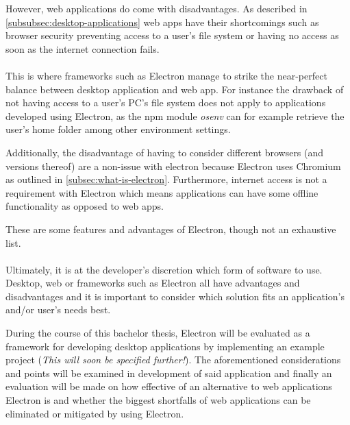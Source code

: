 
However, web applications do come with disadvantages. 
As described in \ref{subsubsec:desktop-applications} web apps have their shortcomings such as 
browser security preventing access to a user's file system or having no access as soon as the internet connection
fails.\paragraph{}
This is where frameworks such as Electron manage to strike the near-perfect balance between desktop application and web app.
For instance the drawback of not having access to a user's PC's file system does not apply to applications 
developed using Electron, as the npm module \emph{osenv} can for example retrieve the user's home folder among 
other environment settings. \parencite{osenv}\par
Additionally, the disadvantage of having to consider different browsers (and versions thereof) are a non-issue
with electron because Electron uses Chromium as outlined in \ref{subsec:what-is-electron}. 
Furthermore, internet access is not a requirement with Electron which means applications can have some offline
functionality as opposed to web apps.\par
These are some features and advantages of Electron, though not an exhaustive list. \parencite{electronDocs}\paragraph{}
Ultimately, it is at the developer's discretion which form of software to use. 
Desktop, web or frameworks such as Electron all have advantages and disadvantages and it is important to consider
which solution fits an application's and/or user's needs best.\par
During the course of this bachelor thesis, Electron will be evaluated as a framework for developing desktop applications
by implementing an example project (\emph{This will soon be specified further!}). 
The aforementioned considerations and points will be examined in development of said application and 
finally an evaluation will be made on how effective of an alternative to web applications Electron is 
and whether the biggest shortfalls of web applications can be eliminated or mitigated by 
using Electron.